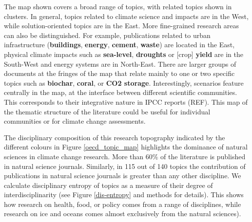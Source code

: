 \documentclass{article}
\begin{document}
\begin{linenumbers}
		
		
		The map shown covers a broad range of topics, with related topics shown in clusters. In general, topics related to climate science and impacts are in the West, while solution-oriented topics are in the East. More fine-grained research areas can also be distinguished. For example, publications related to urban infrastructure (\textbf{buildings}, \textbf{energy}, \textbf{cement}, \textbf{waste}) are located in the East, physical climate impacts such as \textbf{sea-level}, \textbf{droughts}  or [crop] \textbf{yield} are in the South-West and energy systems are in North-East. There are larger groups of documents at the fringes of the map that relate mainly to one or two specific topics such as \textbf{biochar}, \textbf{coral}, or \textbf{CO2 storage}. Interestingly, scenarios feature centrally in the map, at the interface between different scientific communities. This corresponds to their integrative nature in IPCC reports (REF). This map of the thematic structure of the literature could be useful for individual communities or for climate change assessments.
		
		
		The disciplinary composition of this research topography indicated by the different colours in Figure \ref{oecd_topic_map} highlights the dominance of natural sciences in climate change research. More than 60\% of the literature is published in natural science journals. Similarly, in 115 out of 140 topics the contribution of publications in natural science journals is greater than any other discipline. We calculate disciplinary entropy of topics as a measure of their degree of interdisciplinarity (see Figure \ref{dis-entropy} and methods for details). This shows how research on health, food, or policy comes from a range of disciplines, while research on ice and oceans comes almost exclusively from the natural sciences). 
		

\end{linenumbers}
\end{document}
